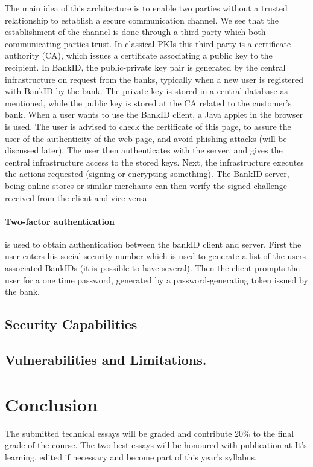 \documentclass[a4paper,11pt]{article}
\begin{document}
 The main idea of this architecture is to enable two parties without a trusted relationship to establish a secure communication channel. We see that the establishment of the channel is done through a third party which both communicating parties trust. In classical PKIs this third party is a certificate authority (CA), which issues a certificate associating a public key to the recipient. In BankID, the public-private key pair is generated by the central infrastructure on request from the banks, typically when a new user is registered with BankID by the bank. The private key is stored in a central database as mentioned, while the public key is stored at the CA related to the customer's bank. When a user wants to use the BankID client, a Java applet in the browser is used. The user is advised to check the certificate of this page, to assure the user of the authenticity of the web page, and avoid phishing attacks (will be discussed later). The user then authenticates with the server, and gives the central infrastructure access to the stored keys. Next, the infrastructure executes the actions requested (signing or encrypting something). The BankID server, being online stores or similar merchants can then verify the signed challenge received from the client and vice versa. \cite{bankid}
 

\paragraph{Two-factor authentication} is used to obtain authentication between the bankID client and server. First the user enters his social security number which is used to generate a list of the users associated BankIDs (it is possible to have several). Then the client prompts the user for a one time password, generated by a password-generating token issued by the bank. 


\subsection{Security Capabilities}

\subsection{Vulnerabilities and Limitations.}




\section{Conclusion}
The submitted technical essays will be graded and contribute 20\% to the final grade of the course. The two best essays will be honoured with publication at It's learning, edited if necessary and become part of this year's  syllabus.
\end{document}
